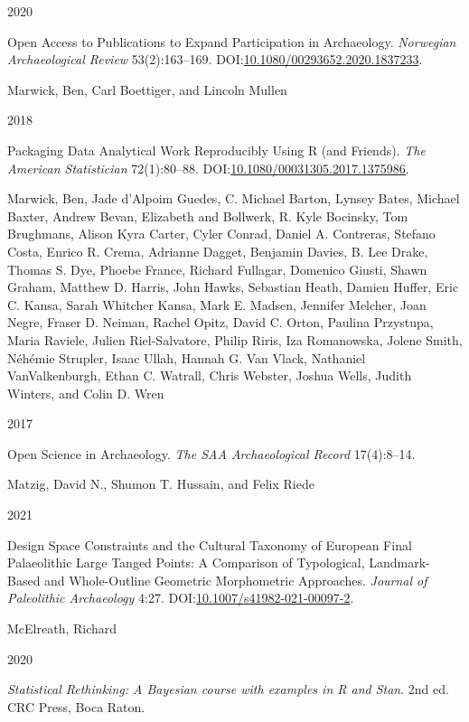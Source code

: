 \documentclass[
  12pt,
  a4paper,
  oneside]{book}
\newlength{\cslhangindent}
\newlength{\csllabelwidth}
\newlength{\cslentryspacingunit} %
\newenvironment{CSLReferences}[2] %
 {%
  \setlength{\parindent}{0pt}
  \ifodd #1
  \let\oldpar\par
  \def\par{\hangindent=\cslhangindent\oldpar}
  \fi
  \setlength{\parskip}{#2\cslentryspacingunit}
 }%
 {}
\newcommand{\CSLBlock}[1]{#1\hfill\break}
\newcommand{\CSLLeftMargin}[1]{\parbox[t]{\csllabelwidth}{#1}}
\newcommand{\CSLRightInline}[1]{\parbox[t]{\linewidth - \csllabelwidth}{#1}\break}
\begin{document}
\begin{CSLReferences}{0}{0}
\leavevmode{}%
\CSLLeftMargin{ 2020 }
\CSLRightInline{{Open Access to Publications to Expand Participation in Archaeology}. \emph{Norwegian Archaeological Review} 53(2):163--169. DOI:\href{https://doi.org/10.1080/00293652.2020.1837233}{10.1080/00293652.2020.1837233}.}

\leavevmode{}%
\CSLBlock{Marwick, Ben, Carl Boettiger, and Lincoln Mullen}
\CSLLeftMargin{ 2018}
\CSLRightInline{{Packaging Data Analytical Work Reproducibly Using R (and Friends)}. \emph{The American Statistician} 72(1):80--88. DOI:\href{https://doi.org/10.1080/00031305.2017.1375986}{10.1080/00031305.2017.1375986}.}

\leavevmode{}%
\CSLBlock{Marwick, Ben, Jade d'Alpoim Guedes, C. Michael Barton, Lynsey Bates, Michael Baxter, Andrew Bevan, Elizabeth and Bollwerk, R. Kyle Bocinsky, Tom Brughmans, Alison Kyra Carter, Cyler Conrad, Daniel A. Contreras, Stefano Costa, Enrico R. Crema, Adrianne Dagget, Benjamin Davies, B. Lee Drake, Thomas S. Dye, Phoebe France, Richard Fullagar, Domenico Giusti, Shawn Graham, Matthew D. Harris, John Hawks, Sebastian Heath, Damien Huffer, Eric C. Kansa, Sarah Whitcher Kansa, Mark E. Madsen, Jennifer Melcher, Joan Negre, Fraser D. Neiman, Rachel Opitz, David C. Orton, Paulina Przystupa, Maria Raviele, Julien Riel-Salvatore, Philip Riris, Iza Romanowska, Jolene Smith, Néhémie Strupler, Isaac Ullah, Hannah G. Van Vlack, Nathaniel VanValkenburgh, Ethan C. Watrall, Chris Webster, Joshua Wells, Judith Winters, and Colin D. Wren}
\CSLLeftMargin{ 2017}
\CSLRightInline{{Open Science in Archaeology}. \emph{The SAA Archaeological Record} 17(4):8--14.}

\leavevmode{}%
\CSLBlock{Matzig, David N., Shumon T. Hussain, and Felix Riede}
\CSLLeftMargin{ 2021}
\CSLRightInline{{Design Space Constraints and the Cultural Taxonomy of European Final Palaeolithic Large Tanged Points: A Comparison of Typological, Landmark-Based and Whole-Outline Geometric Morphometric Approaches}. \emph{Journal of Paleolithic Archaeology} 4:27. DOI:\href{https://doi.org/10.1007/s41982-021-00097-2}{10.1007/s41982-021-00097-2}.}

\leavevmode{}%
\CSLBlock{McElreath, Richard}
\CSLLeftMargin{ 2020}
\CSLRightInline{\emph{{Statistical Rethinking: A Bayesian course with examples in R and Stan}}. 2nd ed. CRC Press, Boca Raton.}


\end{CSLReferences}
\end{document}
